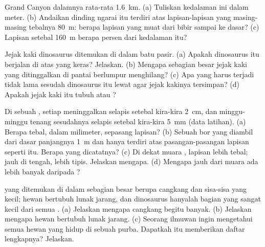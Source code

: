 \begin{exercise}[$\star\star$]\label{exo:g7:sediments-and-fossils:9}
Grand Canyon dalamnya rata-rata \qty{1.6}{km}. (a) Tuliskan kedalaman ini
dalam meter. (b) Andaikan dinding ngarai itu terdiri atas lapisan-lapisan
yang masing-masing tebalnya \qty{80}{m}: berapa lapisan yang muat dari
bibir sampai ke dasar? (c) Lapisan setebal \qty{160}{m} berapa persen dari
kedalaman itu?
\end{exercise}

\begin{exercise}[$\star\star$]\label{exo:g7:sediments-and-fossils:10}
Jejak kaki dinosaurus ditemukan di dalam batu pasir. (a) Apakah dinosaurus
itu berjalan di atas  yang keras? Jelaskan. (b) Mengapa sebagian
besar jejak kaki yang ditinggalkan di pantai berlumpur menghilang? (c) Apa
yang harus terjadi tidak lama sesudah dinosaurus itu lewat agar jejak
kakinya tersimpan? (d) Apakah jejak kaki itu  tubuh atau ?
\end{exercise}

\begin{exercise}[$\star\star\star$]\label{exo:g7:sediments-and-fossils:11}
Di sebuah , setiap  meninggalkan selapis  setebal kira-kira
\qty{2}{cm}, dan minggu-minggu tenang sesudahnya selapis  setebal
kira-kira \qty{5}{mm} (data latihan). (a) Berapa tebal, dalam milimeter,
sepasang lapisan? (b) Sebuah  bor yang diambil dari dasar 
panjangnya \qty{1}{m} dan hanya terdiri atas pasangan-pasangan lapisan
seperti itu. Berapa  yang dicatatnya? (c) Di dekat muara ,
lapisan  lebih tebal; jauh di tengah, lebih tipis. Jelaskan
mengapa. (d) Mengapa jauh dari muara ada lebih banyak  daripada
?
\end{exercise}

\begin{exercise}[$\star\star\star$]\label{exo:g7:sediments-and-fossils:12}
 yang ditemukan di dalam  sebagian besar berupa cangkang dan
sisa-sisa yang kecil;  hewan bertubuh lunak jarang, dan dinosaurus
hanyalah bagian yang sangat kecil dari semua . (a) Jelaskan mengapa
cangkang begitu banyak. (b) Jelaskan mengapa hewan bertubuh lunak jarang.
(c) Seorang ilmuwan ingin mengetahui semua hewan yang hidup di sebuah 
purba. Dapatkah  itu memberikan daftar lengkapnya? Jelaskan.
\end{exercise}

